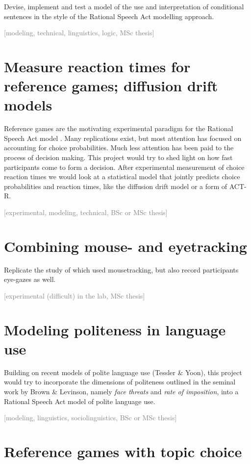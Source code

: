 \documentclass[fleqn,reqno,10pt]{article}
\newcommand{\scope}[1]{\hfill\textcolor{gray}{[#1]}}
\begin{document}
Devise, implement and test a model of the use and interpretation of conditional sentences in the style of the Rational Speech Act modelling approach.

\scope{modeling, technical, linguistics, logic, MSc thesis}

\section{Measure reaction times for reference games; diffusion drift models}

Reference games are the motivating experimental paradigm for the Rational Speech Act model \citep{GoodmanFrank2016:Pragmatic-Langu}. Many replications exist, but most attention has focused on accounting for choice probabilities. Much less attention has been paid to the process of decision making. This project would try to shed light on how fast participants come to form a decision. After experimental measurement of choice reaction times we would look at a statistical model that jointly predicts choice probabilities and reaction times, like the diffusion drift model \citep[e.g.][]{RatcliffMcKoon2008:The-Diffusion-D} or a form of ACT-R.

\scope{experimental, modeling, technical, BSc or MSc thesis}

\section{Combining mouse- and eyetracking}

Replicate the study of \citet{RoettgerFranke2017:Information-int} which used mousetracking, but also record participants eye-gazes as well.

\scope{experimental (difficult) in the lab, MSc thesis}

\section{Modeling politeness in language use}

Building on recent models of polite language use (Tessler \& Yoon), this project would try to incorporate the dimensions of politeness outlined in the seminal work by Brown \& Levinson, namely \emph{face threats} and \emph{rate of imposition}, into a Rational Speech Act model of polite language use.

\scope{modeling, linguistics, sociolinguistics, BSc or MSc thesis}

\section{Reference games with topic choice}
\end{document}
